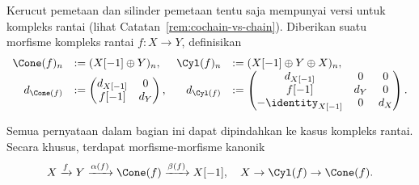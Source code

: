 \begin{catatan}\label{rem:cone-chain}
	Kerucut pemetaan dan silinder pemetaan tentu saja mempunyai versi untuk
	kompleks rantai (lihat Catatan~\ref{rem:cochain-vs-chain}). Diberikan suatu
	morfisme kompleks rantai $f:X\to Y$, definisikan
	\[\begin{array}{rlrl}
		\Cone(f)_n & :=(X[-1] \oplus Y)_n, &
		\Cyl(f)_n & := (X[-1] \oplus Y \oplus X)_n, \\
		d_{\Cone(f)} & := \begin{pmatrix} d_{X[-1]} & 0 \\ f[-1] & d_Y \end{pmatrix}, &
		d_{\Cyl(f)} & := \begin{pmatrix} d_{X[-1]} & 0 & 0 \\ f[-1] & d_Y & 0 \\ -\identity_{X[-1]} & 0 & d_X \end{pmatrix}.
	\end{array}\]

	Semua pernyataan dalam bagian ini dapat dipindahkan ke kasus kompleks
	rantai. Secara khusus, terdapat morfisme-morfisme kanonik
	\[ X \xrightarrow{f} Y \xrightarrow{\alpha(f)} \Cone(f) \xrightarrow{\beta(f)} X[-1], \quad X \to \Cyl(f) \to \Cone(f). \]
\end{catatan}
